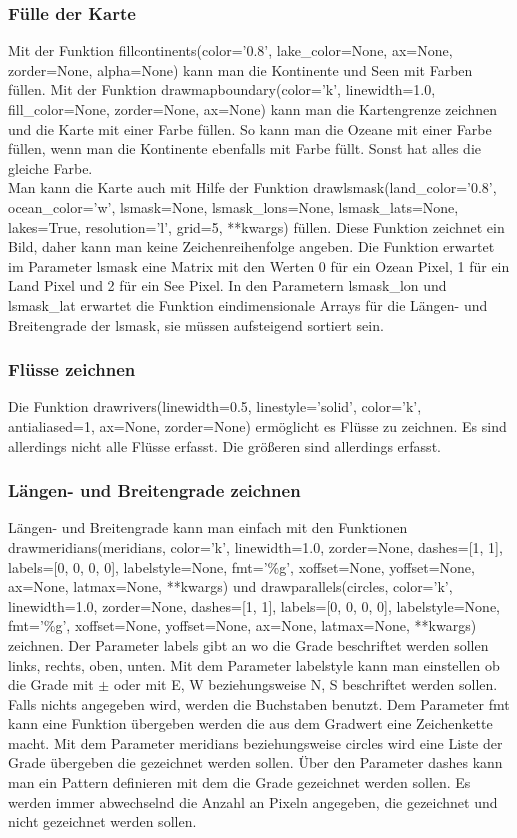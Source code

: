  \subsubsection*{Fülle der Karte}
 Mit der Funktion \textsf{fillcontinents(color='0.8', lake\_color=None, ax=None, zorder=None, alpha=None)} kann man die Kontinente und Seen mit Farben füllen.
 Mit der Funktion \textsf{drawmapboundary(color='k', linewidth=1.0, fill\_color=None, zorder=None, ax=None)} kann man die Kartengrenze zeichnen und die Karte mit einer Farbe füllen. So kann man die Ozeane mit einer Farbe füllen, wenn man die Kontinente ebenfalls mit Farbe füllt. Sonst hat alles die gleiche Farbe.\\
 Man kann die Karte auch mit Hilfe der Funktion \textsf{drawlsmask(land\_color='0.8', ocean\_color='w', lsmask=None, lsmask\_lons=None, lsmask\_lats=None, lakes=True, resolution='l', grid=5, **kwargs)} füllen.
 Diese Funktion zeichnet ein Bild, daher kann man keine Zeichenreihenfolge angeben. Die Funktion erwartet im Parameter \textsf{lsmask} eine Matrix mit den Werten 0 für ein Ozean Pixel, 1 für ein Land Pixel und 2 für ein See Pixel. In den Parametern \textsf{lsmask\_lon} und \textsf{lsmask\_lat} erwartet die Funktion eindimensionale Arrays für die Längen- und Breitengrade der \textsf{lsmask}, sie müssen aufsteigend sortiert sein.
 \subsubsection*{Flüsse zeichnen}
 Die Funktion \textsf{drawrivers(linewidth=0.5, linestyle='solid', color='k', antialiased=1, ax=None, zorder=None)} ermöglicht es Flüsse zu zeichnen. Es sind allerdings nicht alle Flüsse erfasst. Die größeren sind allerdings erfasst.\\
 \subsubsection*{Längen- und Breitengrade zeichnen}
 Längen- und Breitengrade kann man einfach mit den Funktionen \textsf{drawmeridians(meridians, color='k', linewidth=1.0, zorder=None, dashes=[1, 1], labels=[0, 0, 0, 0], labelstyle=None, fmt='\%g', xoffset=None, yoffset=None, ax=None, latmax=None, **kwargs)} und \textsf{drawparallels(circles, color='k', linewidth=1.0, zorder=None, dashes=[1, 1], labels=[0, 0, 0, 0], labelstyle=None, fmt='\%g', xoffset=None, yoffset=None, ax=None, latmax=None, **kwargs)} zeichnen. Der Parameter \textsf{labels} gibt an wo die Grade beschriftet werden sollen links, rechts, oben, unten. Mit dem Parameter \textsf{labelstyle} kann man einstellen ob die Grade mit $ \pm $ oder mit E, W beziehungsweise N, S beschriftet werden sollen. Falls nichts angegeben wird, werden die Buchstaben benutzt. Dem Parameter \textsf{fmt} kann eine Funktion übergeben werden die aus dem Gradwert eine Zeichenkette macht.
 Mit dem Parameter \textsf{meridians} beziehungsweise \textsf{circles} wird eine Liste der Grade übergeben die gezeichnet werden sollen. Über den Parameter \textsf{dashes} kann man ein Pattern definieren mit dem die Grade gezeichnet werden sollen. Es werden immer abwechselnd die Anzahl an Pixeln angegeben, die gezeichnet und nicht gezeichnet werden sollen.\\
